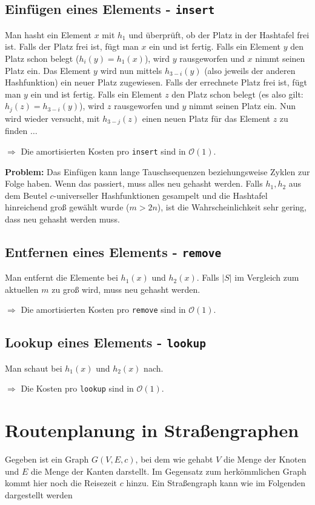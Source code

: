 \documentclass{scrartcl}%
\begin{document}
    \subsection*{Einfügen eines Elements - \texttt{insert}}
    Man hasht ein Element $x$  mit $h_1$ und überprüft, ob der Platz in der Hashtafel frei ist.
    Falls der Platz frei ist, fügt man $x$ ein und ist fertig.
    Falls ein Element $y$ den Platz schon belegt ($h_i(y) = h_1(x)$), wird $y$ rausgeworfen und $x$ nimmt seinen Platz ein.
    Das Element $y$ wird nun mittels $h_{3-i}(y)$ (also jeweils der anderen Hashfunktion) ein neuer Platz zugewiesen.
    Falls der errechnete Platz frei ist, fügt man $y$ ein und ist fertig.
    Falls ein Element $z$ den Platz schon belegt (es also gilt: $h_j(z) = h_{3-i}(y)$), wird $z$ rausgeworfen und $y$ nimmt seinen Platz ein.
    Nun wird wieder versucht, mit $h_{3-j}(z)$ einen neuen Platz für das Element $z$ zu finden $\ldots$

    $\Rightarrow$ Die amortisierten Kosten pro \texttt{insert} sind in $\mathcal{O}(1)$.

    \vspace*{0.3cm}
    \textbf{\textsf{Problem:}} Das Einfügen kann lange Tauschsequenzen beziehungsweise Zyklen zur Folge haben.
    Wenn das passiert, muss alles neu gehasht werden.
    Falls $h_1,h_2$ aus dem Beutel $c$-universeller Hashfunktionen gesampelt und die Hashtafel hinreichend groß
    gewählt wurde ($m > 2n$), ist die Wahrscheinlichkeit sehr gering, dass neu gehasht werden muss.

    \subsection*{Entfernen eines Elements - \texttt{remove}}
    Man entfernt die Elemente bei $h_1(x)$ und $h_2(x)$.
    Falls $|S|$ im Vergleich zum aktuellen $m$ zu groß wird, muss neu gehasht werden.

    $\Rightarrow$ Die amortisierten Kosten pro \texttt{remove} sind in $\mathcal{O}(1)$.

    \subsection*{Lookup eines Elements - \texttt{lookup}}
    Man schaut bei $h_1(x)$ und $h_2(x)$ nach.

    $\Rightarrow$ Die Kosten pro \texttt{lookup} sind in $\mathcal{O}(1)$.

    \newpage
    \section*{Routenplanung in Straßengraphen}
    Gegeben ist ein Graph $G(V, E, c)$, bei dem wie gehabt $V$ die Menge der Knoten und $E$ die Menge der Kanten darstellt.
    Im Gegensatz zum herkömmlichen Graph kommt hier noch die Reisezeit $c$ hinzu.
    Ein Straßengraph kann wie im Folgenden dargestellt werden
\end{document}
